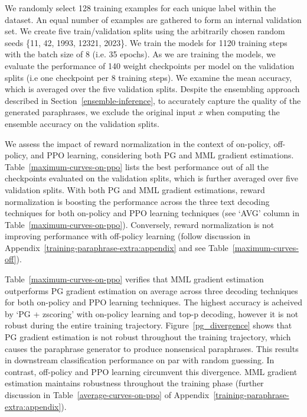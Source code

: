 \documentclass[11pt]{article}
\begin{document}
We randomly select 128 training examples for each unique label within the dataset. An equal number of examples are gathered to form an internal validation set. We create five train/validation splits using the arbitrarily chosen random seeds \{11, 42, 1993, 12321, 2023\}. We train the models for 1120 training steps with the batch size of 8 (i.e. 35 epochs). As we are training the models, we evaluate the performance of 140 weight checkpoints per model on the validation splits (i.e one checkpoint per 8 training steps). We examine the mean accuracy, which is averaged over the five validation splits. Despite the ensembling approach described in Section~\ref{ensemble-inference}, to accurately capture the quality of the generated paraphrases, we exclude the original input $x$ when computing the ensemble accuracy on the validation splits.

We assess the impact of reward normalization in the context of on-policy, off-policy, and PPO learning, considering both PG and MML gradient estimations. Table~\ref{maximum-curves-on-ppo} lists the best performance out of all the checkpoints evaluated on the validation splits, which is further averaged over five validation splits. With both PG and MML gradient estimations, reward normalization is boosting the performance across the three text decoding techniques for both on-policy and PPO learning techniques (see `AVG' column in Table~\ref{maximum-curves-on-ppo}). Conversely, reward normalization is not improving performance with off-policy learning (follow discussion in Appendix~\ref{training-paraphrase-extra:appendix} and see Table~\ref{maximum-curves-off}).

Table~\ref{maximum-curves-on-ppo} verifies that MML gradient estimation outperforms PG gradient estimation on average across three decoding techniques for both on-policy and PPO learning techniques. The highest accuracy is acheived by `PG {\small + zscoring}' with on-policy learning and top-p decoding, however it is not robust during the entire training trajectory. Figure~\ref{pg_divergence} shows that PG gradient estimation is not robust throughout the training trajectory, which causes the paraphrase generator to produce nonsensical paraphrases.  This results in downstream classification performance on par with random guessing. In contrast, off-policy and PPO learning circumvent this divergence. MML gradient estimation maintains robustness throughout the training phase (further discussion in Table~\ref{average-curves-on-ppo} of Appendix~\ref{training-paraphrase-extra:appendix}).
\end{document}
